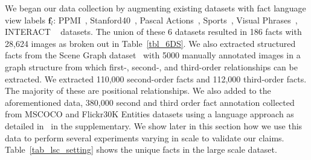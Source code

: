 \documentclass[runningheads]{llncs}
\begin{document}
We began our data collection by augmenting existing datasets with fact language view labels $\mathbf{f}_l$: PPMI~\cite{yao2010grouplet}, Stanford40~\cite{yao2011human}, Pascal Actions~\cite{pascal_voc_2012}, Sports~\cite{abhinavg09}, Visual Phrases~\cite{sadeghi2011recognition}, INTERACT ~\cite{antol2014zero} datasets. The union of these 6 datasets resulted in 186 facts with 28,624 images as broken out in Table~\ref{tbl_6DS}.
We also extracted structured facts from the Scene Graph dataset~\cite{johnson2015image} with 5000 manually annotated images in a graph structure from which first-, second-, and third-order relationships can be extracted. We extracted 110,000 second-order facts and 112,000 third-order facts.  The majority of these are positional relationships. We also added to the aforementioned data,  380,000 second and third order fact annotation  collected from MSCOCO and Flickr30K Entities datasets using a language approach as detailed in~\cite{safa2016_acl} in the supplementary. We show later in this section how we use this data to perform several experiments varying in scale to validate our claims. Table~\ref{tab_lsc_setting} shows the unique facts in the large scale dataset.
\end{document}
